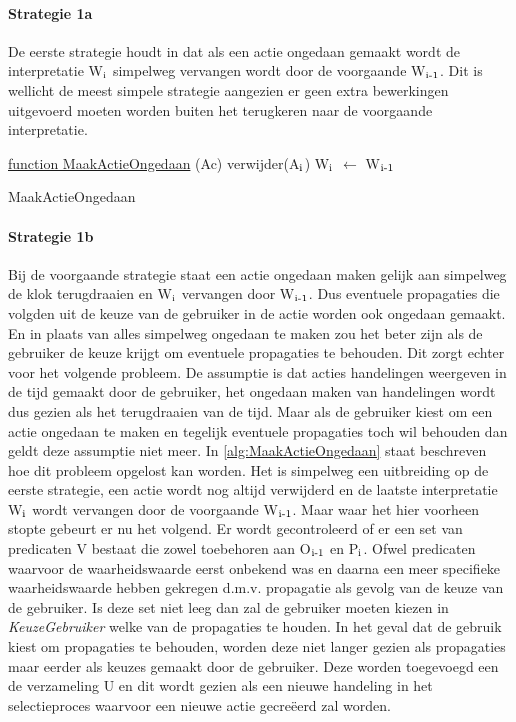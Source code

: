 \paragraph{Strategie 1a}
De eerste strategie houdt in dat als een actie ongedaan gemaakt wordt de interpretatie W$\textsubscript{i}$ simpelweg vervangen wordt door de voorgaande W$\textsubscript{i-1}$. Dit is wellicht de meest simpele strategie aangezien er geen extra bewerkingen uitgevoerd moeten worden buiten het terugkeren naar de voorgaande interpretatie.

\begin{algorithm}
	\underline{function MaakActieOngedaan} (Ac)\;
	\Output{}
	verwijder(A$\textsubscript{i}$)\;
	W$\textsubscript{i}$ $\leftarrow$ W$\textsubscript{i-1}$\;
	\caption{MaakActieOngedaan\label{alg:Strategie1a}}
\end{algorithm}

\paragraph{Strategie 1b}
Bij de voorgaande strategie staat een actie ongedaan maken gelijk aan simpelweg de klok terugdraaien en W$\textsubscript{i}$ vervangen door W$\textsubscript{i-1}$. Dus eventuele propagaties die volgden uit de keuze van de gebruiker in de actie worden ook ongedaan gemaakt. En in plaats van alles simpelweg ongedaan te maken zou het beter zijn als de gebruiker de keuze krijgt om eventuele propagaties te behouden. Dit zorgt echter voor het volgende probleem. De assumptie is dat acties handelingen weergeven in de tijd gemaakt door de gebruiker, het ongedaan maken van handelingen wordt dus gezien als het terugdraaien van de tijd. Maar als de gebruiker kiest om een actie ongedaan te maken en tegelijk eventuele propagaties toch wil behouden dan geldt deze assumptie niet meer. In \ref{alg:MaakActieOngedaan} staat beschreven hoe dit probleem opgelost kan worden. 
Het is simpelweg een uitbreiding op de eerste strategie, een actie wordt nog altijd verwijderd en de laatste interpretatie W$\textsubscript{i}$ wordt vervangen door de voorgaande W$\textsubscript{i-1}$. Maar waar het hier voorheen stopte gebeurt er nu het volgend. Er wordt gecontroleerd of er een set van predicaten V bestaat die zowel toebehoren aan O$\textsubscript{i-1}$ en P$\textsubscript{i}$. Ofwel predicaten waarvoor de waarheidswaarde eerst onbekend was en daarna een meer specifieke waarheidswaarde hebben gekregen d.m.v. propagatie als gevolg van de keuze van de gebruiker. Is deze set niet leeg dan zal de gebruiker moeten kiezen in \emph{KeuzeGebruiker} welke van de propagaties te houden. In het geval dat de gebruik kiest om propagaties te behouden, worden deze niet langer gezien als propagaties maar eerder als keuzes gemaakt door de gebruiker. Deze worden toegevoegd een de verzameling U en dit wordt gezien als een nieuwe handeling in het selectieproces waarvoor een nieuwe actie gecre\"{e}erd zal worden.

